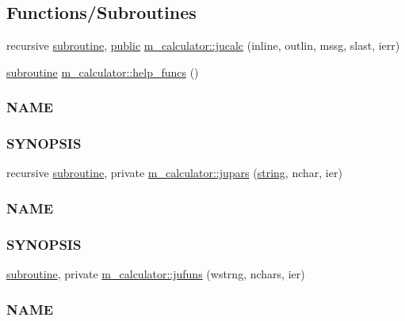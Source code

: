 \subsection*{Functions/\+Subroutines}
\begin{DoxyCompactItemize}
\item 
recursive \hyperlink{M__stopwatch_83_8txt_acfbcff50169d691ff02d4a123ed70482}{subroutine}, \hyperlink{M__stopwatch_83_8txt_a2f74811300c361e53b430611a7d1769f}{public} \hyperlink{namespacem__calculator_a2a06dd612d1c0e059f6fb2a267325201}{m\+\_\+calculator\+::jucalc} (inline, outlin, mssg, slast, ierr)
\item 
\hyperlink{M__stopwatch_83_8txt_acfbcff50169d691ff02d4a123ed70482}{subroutine} \hyperlink{namespacem__calculator_a190e152c2fc309d59e75ee4645e6d261}{m\+\_\+calculator\+::help\+\_\+funcs} ()
\begin{DoxyCompactList}\small\item\em \subsubsection*{N\+A\+ME}

\subsubsection*{S\+Y\+N\+O\+P\+S\+IS}\end{DoxyCompactList}\item 
recursive \hyperlink{M__stopwatch_83_8txt_acfbcff50169d691ff02d4a123ed70482}{subroutine}, private \hyperlink{namespacem__calculator_a183990dad923a0e1338b0df538c3fec8}{m\+\_\+calculator\+::jupars} (\hyperlink{what__overview_81_8txt_a74cb7e955273b9f9157b4f0c18a38849}{string}, nchar, ier)
\begin{DoxyCompactList}\small\item\em \subsubsection*{N\+A\+ME}

\subsubsection*{S\+Y\+N\+O\+P\+S\+IS}\end{DoxyCompactList}\item 
\hyperlink{M__stopwatch_83_8txt_acfbcff50169d691ff02d4a123ed70482}{subroutine}, private \hyperlink{namespacem__calculator_ab9afbbbd87dd1434f72853350afec2a6}{m\+\_\+calculator\+::jufuns} (wstrng, nchars, ier)
\begin{DoxyCompactList}\small\item\em \subsubsection*{N\+A\+ME}


\end{DoxyCompactList}
\end{DoxyCompactItemize}
